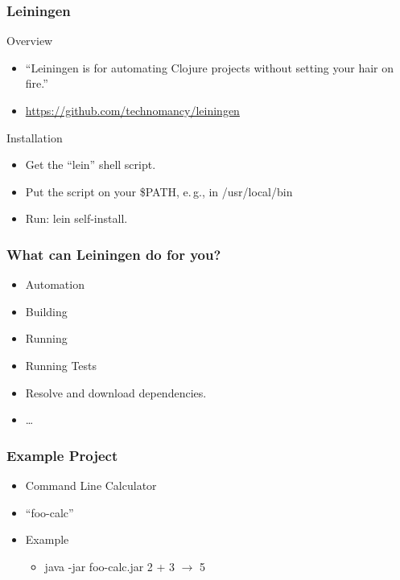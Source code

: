 \documentclass{beamer}
\begin{document}
  \begin{frame}
    \frametitle{Leiningen}
    \begin{block}{Overview}
      \begin{itemize} 
        \item ``Leiningen is for automating Clojure projects without setting your hair on fire.''
        \item \url{https://github.com/technomancy/leiningen}
      \end{itemize}
    \end{block}
    \begin{block}{Installation}
      \begin{itemize} 
        \item Get the ``lein'' shell script.
        \item Put the script on your \$PATH, e.\,g., in /usr/local/bin
        \item Run: lein self-install.
      \end{itemize}
    \end{block}
  \end{frame}

  \begin{frame}
    \frametitle{What can Leiningen do for you?}
    \begin{itemize}
      \item Automation
      \item Building
      \item Running
      \item Running Tests
      \item Resolve and download dependencies.
      \item \ldots
    \end{itemize}
  \end{frame}

  \begin{frame}
    \frametitle{Example Project}
    \begin{itemize}
      \item Command Line Calculator
      \item ``foo-calc''
      \item Example
          \begin{itemize}
              \item java -jar foo-calc.jar 2 + 3 $\rightarrow$ 5
          \end{itemize}
    \end{itemize}
  \end{frame}
\end{document}
